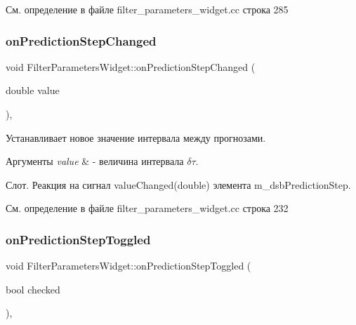 См. определение в файле filter\+\_\+parameters\+\_\+widget.\+cc строка 285

\hypertarget{class_filter_parameters_widget_aa78cbb97c3a70babc20c35cf0e6f346a}{}\label{class_filter_parameters_widget_aa78cbb97c3a70babc20c35cf0e6f346a} 
\subsubsection{\texorpdfstring{on\+Prediction\+Step\+Changed}{onPredictionStepChanged}}
{\footnotesize\ttfamily void Filter\+Parameters\+Widget\+::on\+Prediction\+Step\+Changed (\begin{DoxyParamCaption}\item[{double}]{value }\end{DoxyParamCaption})\hspace{0.3cm}{\ttfamily [private]}, {\ttfamily [slot]}}



Устанавливает новое значение интервала между прогнозами. 


\begin{DoxyParams}{Аргументы}
{\em value} & -\/ величина интервала $\delta \tau$.\\
\hline
\end{DoxyParams}
Слот. Реакция на сигнал value\+Changed(double) элемента m\+\_\+dsb\+Prediction\+Step. 

См. определение в файле filter\+\_\+parameters\+\_\+widget.\+cc строка 232

\hypertarget{class_filter_parameters_widget_aa5168232b5731eafd599c451fd9a54f9}{}\label{class_filter_parameters_widget_aa5168232b5731eafd599c451fd9a54f9} 
\subsubsection{\texorpdfstring{on\+Prediction\+Step\+Toggled}{onPredictionStepToggled}}
{\footnotesize\ttfamily void Filter\+Parameters\+Widget\+::on\+Prediction\+Step\+Toggled (\begin{DoxyParamCaption}\item[{bool}]{checked }\end{DoxyParamCaption})\hspace{0.3cm}{\ttfamily [private]}, {\ttfamily [slot]}}



